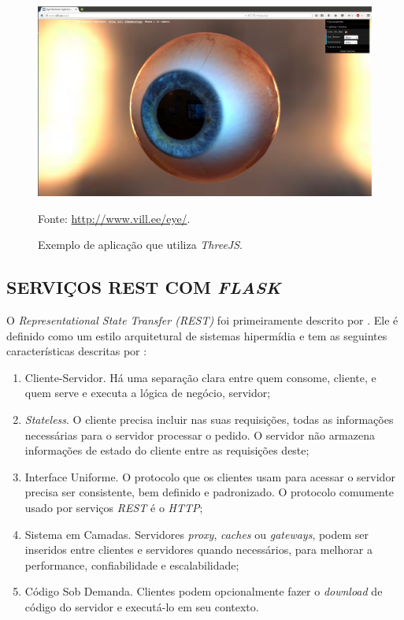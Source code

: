 \begin{figure}[ht]
	\centering
	\includegraphics[width=14cm]{figuras/evil_eye.eps}
	\caption{Exemplo de aplicação que utiliza \emph{ThreeJS}.}
	\label{evil_eye}
	\footnotesize Fonte: \url{http://www.vill.ee/eye/}.
\end{figure}


\subsection{SERVIÇOS REST COM \emph{FLASK}}
\label{servicos_rest}

O \emph{Representational State Transfer (REST)} foi primeiramente descrito por \cite{Fielding2000}. 
Ele é definido como um estilo arquitetural de sistemas hipermídia e tem as seguintes características descritas por \cite{Grinberg2014}:

\begin{enumerate}
	\item Cliente-Servidor. Há uma separação clara entre quem consome, cliente, e quem serve e executa a lógica de negócio, servidor;
	\item \emph{Stateless}. O cliente precisa incluir nas suas requisições, todas as informações necessárias para o servidor processar o pedido. O servidor não armazena informações de estado do cliente entre as requisições deste;
	\item Interface Uniforme. O protocolo que os clientes usam para acessar o servidor precisa ser consistente, bem definido e padronizado. O protocolo comumente usado por serviços \emph{REST} é o \emph{HTTP};
	\item Sistema em Camadas. Servidores \emph{proxy}, \emph{caches} ou \emph{gateways}, podem ser inseridos entre clientes e servidores quando necessários, para melhorar a performance, confiabilidade e escalabilidade;
	\item Código Sob Demanda. Clientes podem opcionalmente fazer o \emph{download} de código do servidor e executá-lo em seu contexto.
\end{enumerate}

